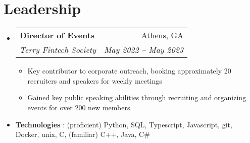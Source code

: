 \documentclass[letterpaper,11pt]{article}
\makeatletter
\newcommand{\resumeItem}[1]{
  \item\small{#1}
}
\newcommand{\resumeSubheading}[4]{
  \vspace{-1pt}\item
    \begin{tabular*}{0.97\textwidth}[t]{l@{\extracolsep{\fill}}r}
      \textbf{#1} & #2 \\
      \textit{\small#3} & \textit{\small #4} \\
    \end{tabular*}\vspace{-7pt}
}
\newcommand{\resumeSubItem}[2]{\resumeItem{#1}{#2}\vspace{-1pt}}
\newcommand{\resumeSubHeadingListStart}{\begin{itemize}[leftmargin=*]}
\newcommand{\resumeSubHeadingListEnd}{\end{itemize}}
\newcommand{\resumeItemListStart}{\begin{itemize}}
\newcommand{\resumeItemListEnd}{\end{itemize}\vspace{-10pt}}
\makeatother
\begin{document}
\section{Leadership}
\resumeSubHeadingListStart

 
  \resumeSubheading{Director of Events}{Athens, GA}{Terry Fintech Society}{May 2022 -- May 2023}
  \resumeItemListStart
  \resumeItem{Key contributor to corporate outreach, booking approximately 20 recruiters and speakers for weekly meetings}
\resumeItem{Gained key public speaking abilities through recruiting and organizing events for over 200 new members}
  \resumeItemListEnd
  
\resumeSubHeadingListEnd


\resumeSubHeadingListStart
\section{Skills}
\resumeSubItem{\textbf{Technologies}}
{: (proficient) Python, SQL, Typescript, Javascript, git, Docker, unix, C, (familiar) C++, Java, C\#}
\resumeSubHeadingListEnd
\end{document}

